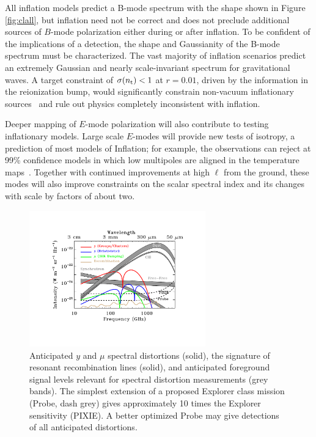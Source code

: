 All inflation models predict a B-mode spectrum with the shape shown in Figure \ref{fig:clall}, but inflation 
need not be correct \cite{Khoury:2001bz,Brandenberger:2012zb,Ijjas:2015hcc} and does not preclude additional sources of $B$-mode polarization either during or after 
inflation. To be confident of the implications of a detection, the shape and Gaussianity of the B-mode spectrum 
must be characterized. The vast majority of inflation scenarios predict an extremely Gaussian and nearly scale-invariant spectrum for 
gravitational waves. A target constraint of $\sigma(n_{\rm t})<1$ at $r=0.01$, driven by the information in the reionization bump, would significantly constrain non-vacuum 
inflationary sources~\cite{Namba:2015gja,Peloso:2016gqs} and rule out physics completely inconsistent with inflation. 

Deeper mapping of $E$-mode polarization will also contribute to testing inflationary models. Large scale $E$-modes will 
provide new tests of isotropy, a prediction of most models of Inflation;  
for example, the observations can reject at 99\% confidence models in which low multipoles are aligned in the temperature maps~\cite{Dvorkin:2007jp}. 
Together with continued improvements at high $\ell$ from the ground, these modes will also improve constraints on the scalar 
spectral index and its changes with scale by factors of about two. 

\begin{figure}[ht!]
\hspace{-0.2in}
\parbox{4.0in}{\centerline {
\includegraphics[width=3.0in]{Figures/probe_spectral_foregrounds_v3.pdf} } }
\hspace{-0.05in}
\parbox{2.5in}{
\caption{ \small \setlength{\baselineskip}{0.95\baselineskip}
Anticipated $y$ and $\mu$ spectral distortions (solid), the signature of resonant recombination lines (solid), and anticipated foreground 
signal levels relevant for spectral distortion measurements (grey bands). 
The simplest extension of a proposed
Explorer class mission (Probe, dash grey) gives approximately 10 times the Explorer sensitivity (PIXIE). 
A better optimized Probe may give detections of all anticipated distortions. 
\label{fig:distortions} } }
\vspace{-0.1in}
\end{figure}

